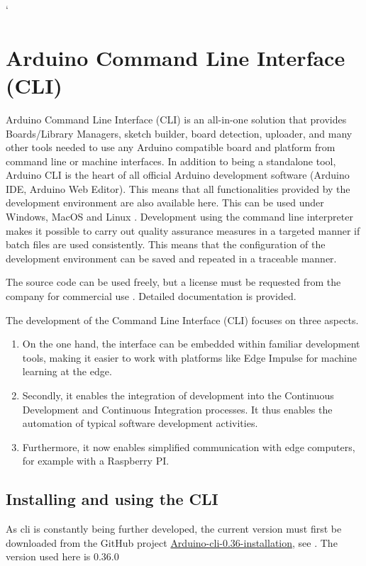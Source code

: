`%
%
%
%
%

\chapter{Arduino Command Line Interface (CLI)}

Arduino Command Line Interface (CLI) is an all-in-one solution that provides Boards/Library Managers, sketch builder, board detection, uploader, and many other tools needed to use any Arduino compatible board and platform from command line or machine interfaces.
In addition to being a standalone tool, Arduino CLI is the heart of all official Arduino development software (Arduino IDE, Arduino Web Editor). This means that all functionalities provided by the development environment are also available here. This can be used under Windows, MacOS and Linux \cite{ArduinoCLIpro:2024}. Development using the command line interpreter makes it possible to carry out quality assurance measures in a targeted manner if batch files are used consistently. This means that the configuration of the development environment can be saved and repeated in a traceable manner.


The source code can be used freely, but a license must be requested from the company for commercial use \cite{ArduinoCLIGit:2024}. Detailed documentation is provided. \cite{ArduinoCLIDoc:2024}

The development of the Command Line Interface (CLI) focuses on three aspects.
\begin{enumerate}
  \item On the one hand, the interface can be embedded within familiar development tools, making it easier to work with platforms like Edge Impulse for machine learning at the edge.
  \item Secondly, it enables the integration of development into the Continuous Development and Continuous Integration processes. It thus enables the automation of typical software development activities.
  \item Furthermore, it now enables simplified communication with edge computers, for example with a Raspberry PI.
\end{enumerate}

\section {Installing and using the CLI}
As \ac{cli} is constantly being further developed, the current version must first be downloaded from the GitHub project \href{https://arduino.github.io/arduino-cli/0.36/installation/}{Arduino-cli-0.36-installation}, see \cite{ArduinoCLIGit:2024}. The version used here is 0.36.0 \cite{ArduinoCLIversion:2024}

